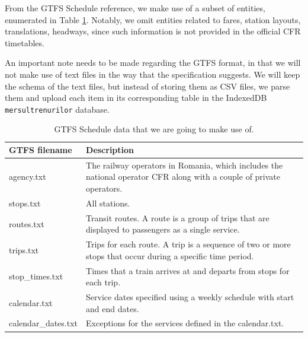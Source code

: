 From the GTFS Schedule reference, we make use of a subset of entities, enumerated in Table \ref{TableGTFS}. Notably, we omit entities related to fares, station layouts, translations, headways, since such information is not provided in the official CFR timetables.

An important note needs to be made regarding the GTFS format, in that we will not make use of text files in the way that the specification suggests. We will keep the schema of the text files, but instead of storing them as CSV files, we parse them and upload each item in its corresponding table in the IndexedDB \verb|mersultrenurilor| database.

\begin{table}[htbp]
    \centering
    \begin{tabular}{|m{}|m{}|}
        \hline
        GTFS filename       & Description                                                                                                          \\
        \hline
        agency.txt          & The railway operators in Romania, which includes the national operator CFR along with a couple of private operators. \\
        \hline
        stops.txt           & All stations.                                                                                                        \\
        \hline
        routes.txt          & Transit routes. A route is a group of trips that are displayed to passengers as a single service.                    \\
        \hline
        trips.txt           & Trips for each route. A trip is a sequence of two or more stops that occur during a specific time period.            \\
        \hline
        stop\_times.txt     & Times that a train arrives at and departs from stops for each trip.                                                  \\
        \hline
        calendar.txt        & Service dates specified using a weekly schedule with start and end dates.                                            \\
        \hline
        calendar\_dates.txt & Exceptions for the services defined in the calendar.txt.                                                             \\
        \hline
    \end{tabular}
    \caption{GTFS Schedule data that we are going to make use of.}
    \label{TableGTFS}
\end{table}

